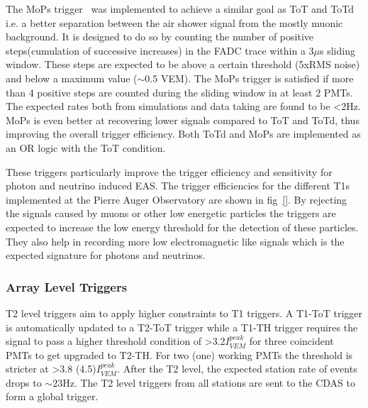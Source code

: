 The MoPs trigger~\cite{gap_note_2011} was implemented to achieve a similar goal as ToT and ToTd i.e. a better separation between the air shower signal from the mostly muonic background. It is designed to do so by counting the number of positive steps(cumulation of successive increases) in the FADC trace within a 3$\mu$s sliding window. These steps are expected to be above a certain threshold (5xRMS noise) and below a maximum value ($\sim$0.5 VEM). The MoPs trigger is satisfied if more than 4 positive steps are counted during the sliding window in at least 2 PMTs. The expected rates both from simulations and data taking are found to be <2Hz. MoPs is even better at recovering lower signals compared to ToT and ToTd, thus improving the overall trigger efficiency. Both ToTd and MoPs are implemented as an OR logic with the ToT condition. 

These triggers particularly improve the trigger efficiency and sensitivity for photon and neutrino induced EAS. The trigger efficiencies for the different T1s implemented at the Pierre Auger Observatory are shown in fig~\ref{}. By rejecting the signals caused by muons or other low energetic particles the triggers are expected to increase the low energy threshold for the detection of these particles. They also help in recording more low electromagnetic like signals which is the expected signature for photons and neutrinos. 

\subsubsection{Array Level Triggers}
\label{sec:Sur_det_trig_array}
T2 level triggers aim to apply higher constraints to T1 triggers. A T1-ToT trigger is automatically updated to a T2-ToT trigger while a T1-TH trigger requires the signal to pass a higher threshold condition of >3.2$I_{VEM}^{peak}$ for three coincident PMTs to get upgraded to T2-TH. For two (one) working PMTs the threshold is stricter at >3.8 (4.5)$I_{VEM}^{peak}$. After the T2 level, the expected station rate of events drops to $\sim$23Hz. The T2 level triggers from all stations are sent to the CDAS to form a global trigger.

